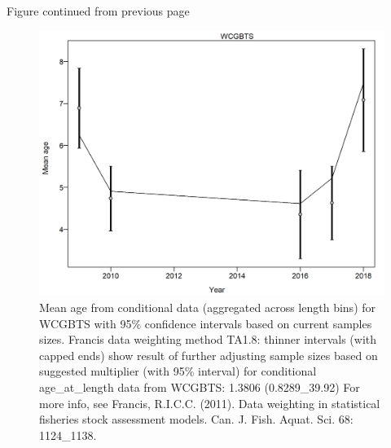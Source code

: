 \documentclass[12pt,]{article}
\begin{document}
\begin{center} 

              Figure continued from previous page 

             \end{center}

\begin{figure}
\centering
\includegraphics{./r4ss/plots_mod1/comp_condAALfit_data_weighting_TA1.8_condAgeWCGBTS.png}
\caption{Mean age from conditional data (aggregated across length bins)
for WCGBTS with 95\% confidence intervals based on current samples
sizes. Francis data weighting method TA1.8: thinner intervals (with
capped ends) show result of further adjusting sample sizes based on
suggested multiplier (with 95\% interval) for conditional
age\_at\_length data from WCGBTS: 1.3806 (0.8289\_39.92) For more info,
see Francis, R.I.C.C. (2011). Data weighting in statistical fisheries
stock assessment models. Can. J. Fish. Aquat. Sci. 68: 1124\_1138.
\label{fig:mod1_6_comp_condAALfit_data_weighting_TA1.8_condAgeWCGBTS}}
\end{figure}
\end{document}
